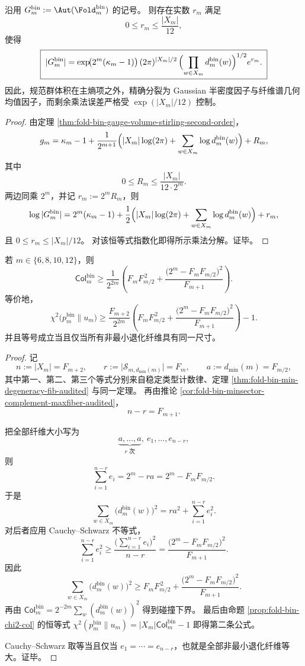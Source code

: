 \begin{theorem}[规范群体积的三因子精确乘法分解]\label{thm:xi-foldbin-gauge-volume-three-factor-product}
沿用
\(
G_m^{\mathrm{bin}}:=\Aut(\Fold_m^{\mathrm{bin}})
\)
的记号。
则存在实数 \(r_m\) 满足
\[
0\le r_m\le \frac{|X_m|}{12},
\]
使得
\[
\boxed{\;
|G_m^{\mathrm{bin}}|
=
\exp\!\bigl(2^m(\kappa_m-1)\bigr)\,
(2\pi)^{|X_m|/2}\,
\Bigl(\prod_{w\in X_m}d_m^{\mathrm{bin}}(w)\Bigr)^{1/2}
e^{r_m}.\;}
\]
因此，规范群体积在主熵项之外，精确分裂为 Gaussian 半密度因子与纤维谱几何均值因子，而剩余乘法误差严格受
\(
\exp(|X_m|/12)
\)
控制。
\end{theorem}
\begin{proof}
由定理 \ref{thm:fold-bin-gauge-volume-stirling-second-order}，
\[
g_m
=
\kappa_m-1+\frac{1}{2^{m+1}}
\Bigl(
|X_m|\log(2\pi)+\sum_{w\in X_m}\log d_m^{\mathrm{bin}}(w)
\Bigr)+R_m,
\]
其中
\[
0\le R_m\le \frac{|X_m|}{12\cdot 2^m}.
\]
两边同乘 \(2^m\)，并记
\(
r_m:=2^mR_m
\)，则
\[
\log|G_m^{\mathrm{bin}}|
=
2^m(\kappa_m-1)
+\frac12\Bigl(
|X_m|\log(2\pi)+\sum_{w\in X_m}\log d_m^{\mathrm{bin}}(w)
\Bigr)
+r_m,
\]
且 \(0\le r_m\le |X_m|/12\)。
对该恒等式指数化即得所示乘法分解。证毕。
\end{proof}

\begin{theorem}[审计偶数窗上最小退化扇区强制的显式碰撞下界]\label{thm:xi-foldbin-audited-even-minsector-collision-explicit-floor}
若
\(
m\in\{6,8,10,12\}
\)，则
\[
\boxed{\;
\mathsf{Col}^{\mathrm{bin}}_m
\ge
\frac{1}{2^{2m}}
\left(
F_mF_{m/2}^{\,2}
+
\frac{\bigl(2^m-F_mF_{m/2}\bigr)^2}{F_{m+1}}
\right).\;}
\]
等价地，
\[
\boxed{\;
\chi^2\!\bigl(p_m^{\mathrm{bin}}\|u_m\bigr)
\ge
\frac{F_{m+2}}{2^{2m}}
\left(
F_mF_{m/2}^{\,2}
+
\frac{\bigl(2^m-F_mF_{m/2}\bigr)^2}{F_{m+1}}
\right)-1.\;}
\]
并且等号成立当且仅当所有非最小退化纤维具有同一尺寸。
\end{theorem}
\begin{proof}
记
\[
n:=|X_m|=F_{m+2},
\qquad
r:=\bigl|\mathcal S_{m,d_{\min}(m)}\bigr|=F_m,
\qquad
a:=d_{\min}(m)=F_{m/2},
\]
其中第一、第二、第三个等式分别来自稳定类型计数律、定理 \ref{thm:fold-bin-min-degeneracy-fib-audited} 与同一定理。
再由推论 \ref{cor:fold-bin-minsector-complement-maxfiber-audited}，
\[
n-r=F_{m+1}.
\]

把全部纤维大小写为
\[
\underbrace{a,\dots,a}_{r\text{ 次}},\ e_1,\dots,e_{n-r},
\]
则
\[
\sum_{i=1}^{n-r}e_i=2^m-ra=2^m-F_mF_{m/2}.
\]
于是
\[
\sum_{w\in X_m}\bigl(d_m^{\mathrm{bin}}(w)\bigr)^2
=
ra^2+\sum_{i=1}^{n-r}e_i^2.
\]
对后者应用 Cauchy--Schwarz 不等式，
\[
\sum_{i=1}^{n-r}e_i^2
\ge
\frac{\bigl(\sum_{i=1}^{n-r}e_i\bigr)^2}{n-r}
=
\frac{\bigl(2^m-F_mF_{m/2}\bigr)^2}{F_{m+1}}.
\]
因此
\[
\sum_{w\in X_m}\bigl(d_m^{\mathrm{bin}}(w)\bigr)^2
\ge
F_mF_{m/2}^{\,2}
+
\frac{\bigl(2^m-F_mF_{m/2}\bigr)^2}{F_{m+1}}.
\]
再由
\(
\mathsf{Col}^{\mathrm{bin}}_m
=
2^{-2m}\sum_w(d_m^{\mathrm{bin}}(w))^2
\)
得到碰撞下界。
最后由命题 \ref{prop:fold-bin-chi2-col} 的恒等式
\(
\chi^2(p_m^{\mathrm{bin}}\|u_m)=|X_m|\mathsf{Col}^{\mathrm{bin}}_m-1
\)
即得第二条公式。

Cauchy--Schwarz 取等当且仅当
\(
e_1=\cdots=e_{n-r}
\)，也就是全部非最小退化纤维等大。证毕。
\end{proof}

\endinput
